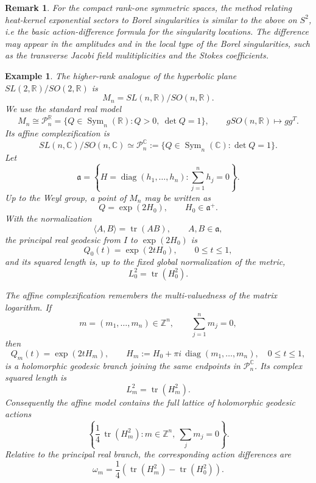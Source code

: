 \documentclass[11pt]{amsart}
\theoremstyle{plain}
\newtheorem{eg}[thm]{Example}
\newtheorem{rmk}[thm]{Remark}
\theoremstyle{definition}
\newcommand{\R}{\mathbb{R}}
\newcommand{\C}{\mathbb{C}}
\begin{document}
\begin{rmk} For the compact rank-one symmetric spaces, the method relating heat-kernel
exponential sectors to Borel singularities is similar to the above on $S^2$, i.e the basic action-difference formula for the singularity locations. The difference may appear in the amplitudes and in the local type of the Borel singularities, such as the transverse Jacobi field mulitiplicities and the Stokes coefficients.
\end{rmk}




\begin{eg}
The higher-rank analogue of the hyperbolic plane
$SL(2,\R)/SO(2,\R)$ is
\[
M_n=SL(n,\R)/SO(n,\R).
\]
We use the standard real model
\[
M_n\cong \mathcal P_n^{\R}=
\{Q\in \operatorname{Sym}_n(\R): Q>0,\ \det Q=1\},
\qquad gSO(n,\R)\longmapsto gg^T.
\]
Its affine complexification is
\[
SL(n,\C)/SO(n,\C)
\simeq\mathcal P_n^{\C}
:=\{Q\in \operatorname{Sym}_n(\C):\det Q=1\}.
\]
Let
\[
\mathfrak a=
\left\{H=\operatorname{diag}(h_1,\ldots,h_n):\sum_{j=1}^n h_j=0\right\}.
\]
Up to the Weyl group, a point of $M_n$ may be written as
\[
Q=\exp(2H_0),\qquad H_0\in\mathfrak a^+ .
\]
With the normalization
\[
\langle A,B\rangle=\operatorname{tr}(AB),\qquad A,B\in\mathfrak a,
\]
the principal real geodesic from $I$ to $\exp(2H_0)$ is
\[
Q_0(t)=\exp(2tH_0),\qquad 0\leq t\leq 1,
\]
and its squared length is, up to the fixed global normalization of the metric,
\[
L_0^2=\operatorname{tr}(H_0^2).
\]

The affine complexification remembers the multi-valuedness of the matrix
logarithm.  If
\[
m=(m_1,\ldots,m_n)\in\mathbb Z^n,\qquad\sum_{j=1}^n m_j=0,
\]
then
\[
Q_m(t)=\exp(2t H_m),
\qquad H_m:=H_0+\pi i\,\operatorname{diag}(m_1,\ldots,m_n),\quad 0\leq t\leq 1,
\]
is a holomorphic geodesic branch joining the same endpoints in
$\mathcal P_n^{\C}$.  Its complex squared length is
\[
L_m^2=\operatorname{tr}(H_m^2).
\]
Consequently the affine model contains the full lattice of holomorphic geodesic
actions
\[
\left\{\frac14\,\operatorname{tr}(H_m^2):m\in\mathbb Z^n,\ \sum_j m_j=0\right\}.
\]
Relative to the principal real branch, the corresponding action
differences are
\[
\omega_m=\frac14\left(\operatorname{tr}(H_m^2)-\operatorname{tr}(H_0^2)\right).
\]


\end{eg}
\end{document}
